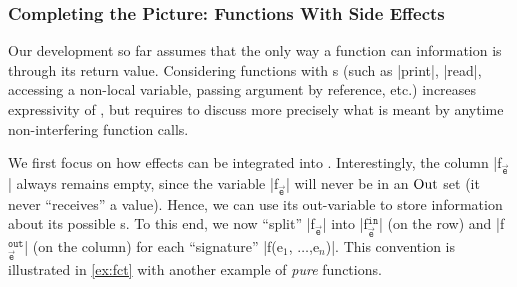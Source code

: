 \subsubsection{Completing the Picture: Functions With Side Effects}
\label{ssec:impure-fct}

Our development so far assumes that the only way a function can 
information is through its return value. Considering functions with s (such as \prc|print|, \prc|read|, accessing a non-local variable,
passing argument by reference, etc.) increases expressivity of
\lname, but requires to discuss more precisely what is
meant by anytime non-interfering function calls.

We first focus on how effects can be integrated into \lname. Interestingly, the
column \prc|f$_{\vec{\mathtt{e}}}$| always remains empty, since the
variable \prc|f$_{\vec{\mathtt{e}}}$| will never be in an
\(\operatorname{Out}\) set (it never \enquote{receives} a value). Hence, we can
use its out-variable to store information about its possible s.
To this end, we now \enquote{split} \prc|f$_{\vec{\mathtt{e}}}$| into
\prc|f$^{\mathtt{in}}_{\vec{\mathtt{e}}}$| (on the row) and
\prc|f$^{\mathtt{out}}_{\vec{\mathtt{e}}}$| (on the column) for each
\enquote{signature} \prc|f(e$_1$, $\hdots$,e$_n$)|. This convention is
illustrated in \autoref{ex:fct} with another example of \emph{pure} functions.

